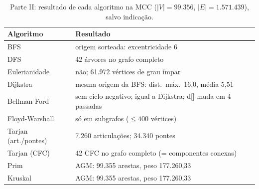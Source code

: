 \begin{table}[t]
\caption{Parte II: resultado de cada algoritmo na MCC ($|V|=99.356$, $|E|=1.571.439$), salvo indicação.}
\label{tab:p2res}
\footnotesize
\begin{tabular}{@{}lp{5.0cm}@{}}
\toprule
Algoritmo & Resultado \\
\midrule
BFS & origem sorteada: excentricidade 6 \\
DFS & 42 árvores no grafo completo \\
Eulerianidade & não; 61.972 vértices de grau ímpar \\
Dijkstra & mesma origem da BFS: dist.\ máx.\ 16{,}0, média 5{,}51 \\
Bellman-Ford & sem ciclo negativo; igual a Dijkstra; d[] muda em 4 passadas \\
Floyd-Warshall & só em subgrafos ($\le 400$ vértices) \\
Tarjan (art./pontes) & 7.260 articulações; 34.340 pontes \\
Tarjan (CFC) & 42 CFC no grafo completo (= componentes conexas) \\
Prim & AGM: 99.355 arestas, peso 177.260{,}33 \\
Kruskal & AGM: 99.355 arestas, peso 177.260{,}33 \\
\bottomrule
\end{tabular}
\end{table}
